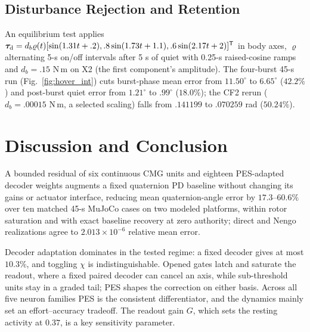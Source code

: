 \documentclass[letterpaper, 10 pt, conference]{ieeeconf}
\newcommand{\T}{^{\mathsf T}}
\begin{document}

\subsection{Disturbance Rejection and Retention}
\label{sec:disturbance}
An equilibrium test applies
$\bm\tau_{\rm d}=d_b\varrho(t)[\sin(1.31t+.2),\allowbreak
.8\sin(1.73t+1.1),\allowbreak.6\sin(2.17t+2)]\T$ in body axes, $\varrho$ alternating
5-s on/off intervals after 5 s of quiet with 0.25-s raised-cosine ramps and
$d_b=.15$ N\,m on X2 (the first component's amplitude). The four-burst 45-s run
(Fig.~\ref{fig:hover_int}) cuts burst-phase mean error from $11.50^\circ$ to
$6.65^\circ$ ($42.2\%$) and post-burst quiet error from $1.21^\circ$ to
$.99^\circ$ ($18.0\%$); the CF2 rerun ($d_b=.00015$ N\,m, a selected scaling)
falls from $.141199$ to $.070259$ rad ($50.24\%$).


\section{Discussion and Conclusion}
\label{sec:conclusion}

A bounded residual of six continuous CMG units and eighteen PES-adapted decoder weights augments a fixed quaternion PD baseline without changing its gains or actuator interface, reducing mean quaternion-angle error by $17.3$--$60.6\%$ over ten matched 45-s MuJoCo cases on two modeled platforms, within rotor saturation and with exact baseline recovery at zero authority; direct and Nengo realizations agree to $2.013\times10^{-6}$ relative mean error.

Decoder adaptation dominates in the tested regime: a fixed decoder gives at most $10.3\%$, and toggling $\chi$ is indistinguishable. Opened gates latch and saturate the readout, where a fixed paired decoder can cancel an axis, while sub-threshold units stay in a graded tail; PES shapes the correction on either basis. Across all five neuron families PES is the consistent differentiator, and the dynamics mainly set an effort--accuracy tradeoff. The readout gain $G$, which sets the resting activity at $0.37$, is a key sensitivity parameter.
\end{document}
